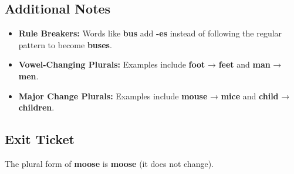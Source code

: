\documentclass[12pt]{article}
\begin{document}
\subsection*{Additional Notes}
\begin{itemize}
    \item \textbf{Rule Breakers:} Words like \textbf{bus} add \textbf{-es} instead of following the regular pattern to become \textbf{buses}.
    \item \textbf{Vowel-Changing Plurals:} Examples include \textbf{foot} → \textbf{feet} and \textbf{man} → \textbf{men}.
    \item \textbf{Major Change Plurals:} Examples include \textbf{mouse} → \textbf{mice} and \textbf{child} → \textbf{children}.
\end{itemize}

\subsection*{Exit Ticket}
The plural form of \textbf{moose} is \textbf{moose} (it does not change).
\end{document}
